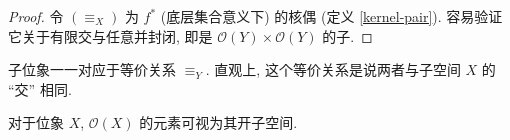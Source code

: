 \begin{proof}
	令 $(\equiv_X)$ 为 $f^*$ (底层集合意义下) 的核偶 (定义 \ref{kernel-pair}). 容易验证它关于有限交与任意并封闭, 即是 $\mathcal O(Y)\times\mathcal O(Y)$ 的子\fm{}.
\end{proof}

子位象一一对应于等价关系 $\equiv_Y$. 直观上, 这个等价关系是说两者与子空间 $X$ 的 ``交'' 相同.


对于位象 $X$, $\mathcal O(X)$ 的元素可视为其开子空间.

